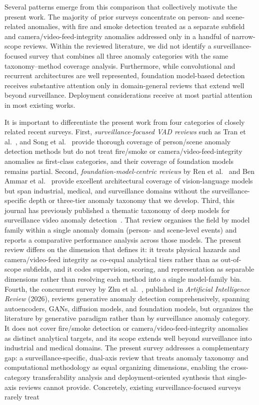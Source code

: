 \documentclass[10pt,a4paper]{article}
\begin{document}
Several patterns emerge from this comparison that collectively motivate the present work. The majority of prior surveys concentrate on person- and scene-related anomalies, with fire and smoke detection treated as a separate subfield and camera/video-feed-integrity anomalies addressed only in a handful of narrow-scope reviews. Within the reviewed literature, we did not identify a surveillance-focused survey that combines all three anomaly categories with the same taxonomy--method coverage analysis. Furthermore, while convolutional and recurrent architectures are well represented, foundation model-based detection receives substantive attention only in domain-general reviews that extend well beyond surveillance. Deployment considerations receive at most partial attention in most existing works.

It is important to differentiate the present work from four categories of closely related recent surveys. First, \emph{surveillance-focused VAD reviews} such as Tran et al.~\citeyearpar{tran2024anomaly_images_videos}, and Song et al.~\citeyearpar{song2024networking_vad} provide thorough coverage of person/scene anomaly detection methods but do not treat fire/smoke or camera/video-feed-integrity anomalies as first-class categories, and their coverage of foundation models remains partial. Second, \emph{foundation-model-centric reviews} by Ren et al.~\citeyearpar{ren2025foundation_anomaly} and Ben Ammar et al.~\citeyearpar{benammar2025foundation_transformer} provide excellent architectural coverage of vision-language models but span industrial, medical, and surveillance domains without the surveillance-specific depth or three-tier anomaly taxonomy that we develop. Third, this journal has previously published a thematic taxonomy of deep models for surveillance video anomaly detection~\citep{chandrakala2023thematic}. That review organises the field by model family within a single anomaly domain (person- and scene-level events) and reports a comparative performance analysis across those models. The present review differs on the dimension that defines it: it treats physical hazards and camera/video-feed integrity as co-equal analytical tiers rather than as out-of-scope subfields, and it codes supervision, scoring, and representation as separable dimensions rather than resolving each method into a single model-family bin. Fourth, the concurrent survey by Zhu et al.~\citeyearpar{zhu2026generative}, published in \emph{Artificial Intelligence Review} (2026), reviews generative anomaly detection comprehensively, spanning autoencoders, GANs, diffusion models, and foundation models, but organizes the literature by generative paradigm rather than by surveillance anomaly category. It does not cover fire/smoke detection or camera/video-feed-integrity anomalies as distinct analytical targets, and its scope extends well beyond surveillance into industrial and medical domains. The present survey addresses a complementary gap: a surveillance-specific, dual-axis review that treats anomaly taxonomy and computational methodology as equal organizing dimensions, enabling the cross-category transferability analysis and deployment-oriented synthesis that single-axis reviews cannot provide. Concretely, existing surveillance-focused surveys rarely treat 
\end{document}
